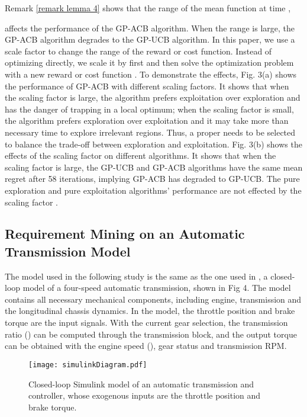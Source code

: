 \documentclass[10pt]{article}
\theoremstyle{plain}
\begin{document}
Remark \ref{remark lemma 4} shows that the range of the mean function  at time , 

affects the performance of the GP-ACB algorithm. When the range  is large, the GP-ACB algorithm degrades to the GP-UCB algorithm. In this paper, we use a scale factor  to change the range of the reward or cost function. Instead of optimizing  directly, we scale it by  first and then solve the optimization problem with a new reward or cost function . To demonstrate the effects, Fig. 3(a) shows the performance of GP-ACB with different scaling factors. It shows that when the scaling factor  is large, the algorithm prefers exploitation over exploration and has the danger of trapping in a local optimum; when the scaling factor  is small, the algorithm prefers exploration over exploitation and it may take more than necessary time to explore irrelevant regions. Thus, a proper  needs to be selected to balance the trade-off between exploration and exploitation. Fig. 3(b) shows the effects of the scaling factor  on different algorithms. It shows that when the scaling factor  is large, the GP-UCB and GP-ACB algorithms have the same mean regret after 58 iterations, implying GP-ACB has degraded to GP-UCB. The pure exploration and pure exploitation algorithms' performance are not effected by the scaling factor .


\subsection{Requirement Mining on an Automatic Transmission Model}

The model used in the following study is the same as the one used in \cite{jin2013mining}, a closed-loop model of a four-speed automatic transmission, shown in Fig 4. The model contains all necessary mechanical components, including engine, transmission and the longitudinal chassis dynamics. In the model, the throttle  position and brake torque are the input signals. With the current gear selection, the transmission ratio () can be computed through the transmission block, and the output torque can be obtained with the engine speed (), gear status and transmission RPM.

\begin{figure}[!htb]
\label{system model}
\centering
\texttt{[image: simulinkDiagram.pdf]}
\caption{Closed-loop Simulink model of an automatic transmission and controller, whose exogenous inputs are the throttle position and brake torque.}
\end{figure}
\end{document}

